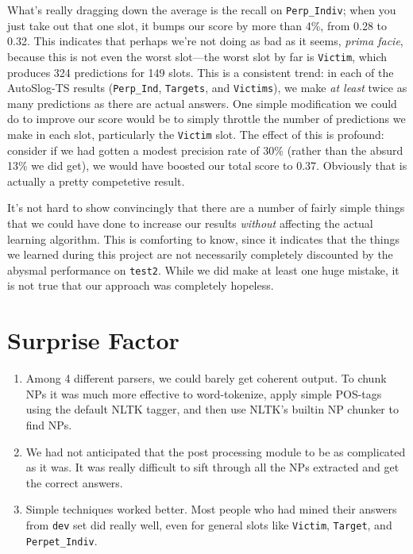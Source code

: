\documentclass[11pt]{myclass}
\begin{document}
What's really dragging down the average is the recall on \texttt{Perp\_Indiv}; when you just take out that one slot, it bumps our score by more than 4\%, from 0.28 to 0.32. This indicates that perhaps we're not doing as bad as it seems, \textit{prima facie}, because this is not even the worst slot---the worst slot by far is \texttt{Victim}, which produces 324 predictions for 149 slots. This is a consistent trend: in each of the AutoSlog-TS results (\texttt{Perp\_Ind}, \texttt{Targets}, and \texttt{Victims}), we make \textit{at least} twice as many predictions as there are actual answers. One simple modification we could do to improve our score would be to simply throttle the number of predictions we make in each slot, particularly the \texttt{Victim} slot. The effect of this is profound: consider if we had gotten a modest precision rate of 30\% (rather than the absurd 13\% we did get), we would have boosted our total score to 0.37. Obviously that is actually a pretty competetive result.

It's not hard to show convincingly that there are a number of fairly simple things that we could have done to increase our results \textit{without} affecting the actual learning algorithm. This is comforting to know, since it indicates that the things we learned during this project are not necessarily completely discounted by the abysmal performance on \texttt{test2}. While we did make at least one huge mistake, it is not true that our approach was completely hopeless.




\section{Surprise Factor}

\begin{enumerate}

\item Among 4 different parsers, we could barely get coherent output. To chunk NPs it was much more effective to word-tokenize, apply simple POS-tags using the default NLTK tagger, and then use NLTK's builtin NP chunker to find NPs.

\item We had not anticipated that the post processing module to be as complicated as it was. It was really difficult to sift through all the NPs extracted and get the correct answers.

\item Simple techniques worked better. Most people who had mined their answers from \texttt{dev} set did really well, even for general slots like \texttt{Victim}, \texttt{Target}, and \texttt{Perpet\_Indiv}.

\end{enumerate}
\end{document}
